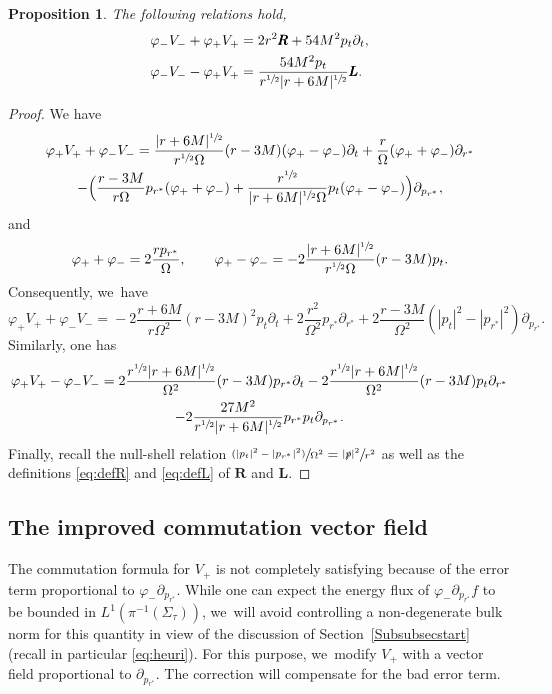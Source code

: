 \documentclass[10pt]{amsart}
\newcommand{\psfrac}[2]{\sfrac{(#1)}{#2}}
\theoremstyle{plain}
\newtheorem{proposition}{Proposition}[section]
\theoremstyle{definition}
\begin{document}
\begin{proposition}\label{ProvarphiV}
The following relations hold,
\begin{align*}
\varphi_-V_-+\varphi_+ V_+ &= 2r^2 \pmb{R} +54M^2p_t\partial_t, \\
\varphi_-V_--\varphi_+ V_+ &= \frac{54M^2p_t}{r^{\sfrac{1}{2}}|r+6M|^{\sfrac{1}{2}}} \pmb{L}.
\end{align*}
\end{proposition}
\begin{proof}
We have
\begin{multline*}
\varphi_+ V_++\varphi_-V_- = \frac{|r+6M|^{\sfrac{1}{2}}}{r^{\sfrac{1}{2}}\Omega}(r-3M)(\varphi_+-\varphi_-) \partial_t+\frac{r}{\Omega} (\varphi_++\varphi_-)\partial_{r^*} \\
-\Bigl(\frac{r-3M}{r\Omega}p_{r^*}(\varphi_++\varphi_-)+\frac{r^{\sfrac{1}{2}}}{|r+6M|^{\sfrac{1}{2}} \Omega}p_t (\varphi_+-\varphi_-) \Bigr) \partial_{p_{r^*}},
\end{multline*}
and
\[
\varphi_++\varphi_-= 2\frac{r p_{r^*}}{\Omega}, \qquad \varphi_+-\varphi_-=-2\frac{|r+6M|^{\sfrac{1}{2}}}{r^{\sfrac{1}{2}}\Omega}(r-3M)p_t.
\]
Consequently, we~have
\[
\varphi_+ V_+\!+\!\varphi_-V_- \!=\! -2\frac{r+6M}{r\Omega^2}(r-3M)^2p_t \partial_t\!+\!2\frac{r^2}{\Omega^2} p_{r^*}\partial_{r^*}
\!+\!2\frac{r-3M}{ \Omega^2}(|p_t|^2-|p_{r^*}|^2) \partial_{p_{r^*}}.
\]
Similarly, one has
\begin{multline*} \varphi_+ V_+-\varphi_-V_- = 2\frac{r^{\sfrac{1}{2}}|r+6M|^{\sfrac{1}{2}}}{\Omega^2}(r-3M)p_{r^*} \partial_t -2\frac{r^{\sfrac{1}{2}}|r+6M|^{\sfrac{1}{2}}}{\Omega^2}(r-3M) p_t\partial_{r^*} \\
-2\frac{27M^2}{r^{\sfrac{1}{2}}|r+6M|^{\sfrac{1}{2}}}p_{r^*}p_t \partial_{p_{r^*}}.
\end{multline*}
Finally, recall the null-shell relation $\psfrac{|p_t|^2-|p_{r^*}|^2}{\Omega^2}=\sfrac{|\slashed{p}|^2}{r^2} $ as well as the definitions \eqref{eq:defR} and \eqref{eq:defL} of $\pmb{R}$ and $\pmb{L}$.
\end{proof}

\subsection{The improved commutation vector field}

The commutation formula for $V_+$ is not completely satisfying because of the error term proportional to $\varphi_- \partial_{p_{r^*}}$. While one can expect the energy flux of $\varphi_- \partial_{p_{r^*}} f$ to be bounded in $L^1(\pi^{-1}(\Sigma_\tau))$, we~will avoid controlling a non-degenerate bulk norm for this quantity in view of the discussion of Section~\ref{Subsubsecstart} (recall in particular \eqref{eq:heuri}). For this purpose, we~modify $V_+$ with a vector field proportional to $\partial_{p_{r^*}}$. The correction will compensate for the bad error term.
\end{document}
